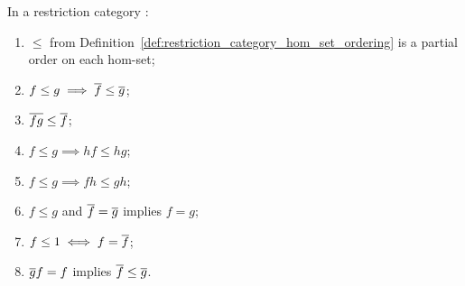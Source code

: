 \begin{lemma}\label{lem:restriction_cats_are_partial_order_enriched}
  In a restriction category \X:
  \begin{multicols}{2}
    \begin{enumerate}[{(}i{)}]
      \item  $\le$ from Definition~\ref{def:restriction_category_hom_set_ordering}
        is a partial order on each hom-set;
      \item $f \le g \implies \overline{f} \le \overline{g}$;\label{lemitem:rst_ordering_2}
      \item $\overline{f g} \le \overline{f}$; \label{lemitem:rst_ordering_3}
      \item $f \le g \implies h f \le h g$;
      \item $f \le g \implies f h \le g h$;
      \item $f \le g$ and $\overline{f} = \overline{g}$ implies $f = g$;
      \item $f \le 1 \iff f = \overline{f}$;
      \item $\overline{g}f = f$ implies $\overline{f} \le \overline{g}$.
    \end{enumerate}
  \end{multicols}
\end{lemma}
